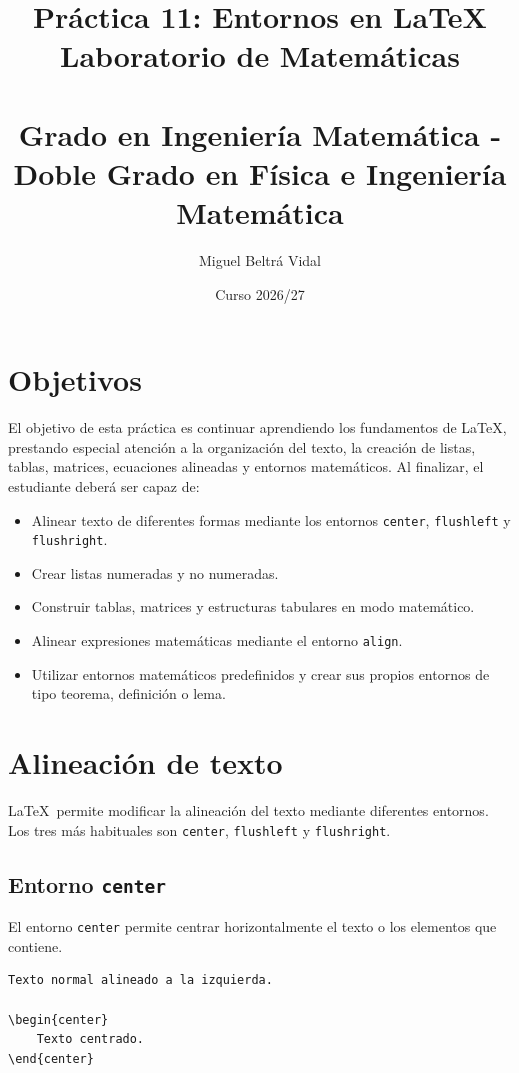 \documentclass[11pt,a4paper]{article}
\title{\LARGE\textbf{Práctica 11: Entornos en \LaTeX}\\[0.5em]
\Large Laboratorio de Matemáticas\\
\small\ \\
\Large Grado en Ingeniería Matemática - Doble Grado en Física e Ingeniería Matemática}
\author{Miguel Beltrá Vidal}
\date{Curso 2026/27}
\theoremstyle{plain}
\theoremstyle{definition}
\theoremstyle{remark}
\theoremstyle{exercise}
\begin{document}
\maketitle

\section{Objetivos}

El objetivo de esta práctica es continuar aprendiendo los fundamentos de \LaTeX, prestando especial atención a la organización del texto, la creación de listas, tablas, matrices, ecuaciones alineadas y entornos matemáticos. Al finalizar, el estudiante deberá ser capaz de:
\begin{itemize}
    \item Alinear texto de diferentes formas mediante los entornos \verb|center|, \verb|flushleft| y \verb|flushright|.
    \item Crear listas numeradas y no numeradas.
    \item Construir tablas, matrices y estructuras tabulares en modo matemático.
    \item Alinear expresiones matemáticas mediante el entorno \verb|align|.
    \item Utilizar entornos matemáticos predefinidos y crear
    sus propios entornos de tipo teorema, definición o lema.
\end{itemize}


\section{Alineación de texto}

\LaTeX\ permite modificar la alineación del texto mediante diferentes entornos. Los tres más habituales son \verb|center|, \verb|flushleft| y \verb|flushright|.

\subsection{Entorno \texttt{center}}

El entorno \verb|center| permite centrar horizontalmente el texto o los elementos que contiene.

\begin{lstlisting}
Texto normal alineado a la izquierda.

\begin{center}
    Texto centrado.
\end{center}
\end{lstlisting}
\end{document}

